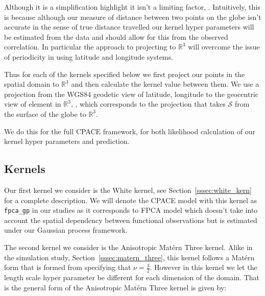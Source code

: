 Although it is a simplification \citep{guinness_isotropic_2016} highlight it isn't a limiting factor, \citep{guinness_isotropic_2016}. 
Intuitively, this is because although our measure of distance between two points on the globe isn't accurate in the sense of true distance travelled our kernel hyper parameters will be estimated from the data and should allow for this from the observed correlation.
In particular the approach to projecting to $\mathbb{R}^3$ will overcome the issue of periodicity in using latitude and longitude systems.

Thus for each of the kernels specified below we first project our points in the spatial domain to $\mathbb{R}^3$ and then calculate the kernel value between them.
We use a projection from the WGS84 geodetic view of latitude, longitude to the geocentric view of element in $\mathbb{R}^3$, \citep{lu_geodetic_2014}, which corresponds to the projection that takes $\mathcal{S}$ from the surface of the globe to $\mathbb{R}^3$.

We do this for the full CPACE framework, for both likelihood calculation of our kernel hyper parameters and prediction.


\subsection{Kernels \label{ssec:cesm_kern}}
Our first kernel we consider is the White kernel, see Section~\ref{sssec:white_kern} for a complete description.
We will denote the CPACE model with this kernel as  \verb*|fpca_gp| in our studies as it corresponds to FPCA model which doesn't take into account the spatial dependency between functional observations but is estimated under our Gaussian process framework.

The second kernel we consider is the Anisotropic Mat\'ern Three kernel.
Alike in the simulation study, Section~\ref{sssec:matern_three}, this kernel follows a Mat\'ern form that is formed from specifying that $\nu=\frac{3}{2}$.
However in this kernel we let the length scale hyper parameter be different for each dimension of the domain.
That is the general form of the Anisotropic Mat\'ern Three kernel is given by:

